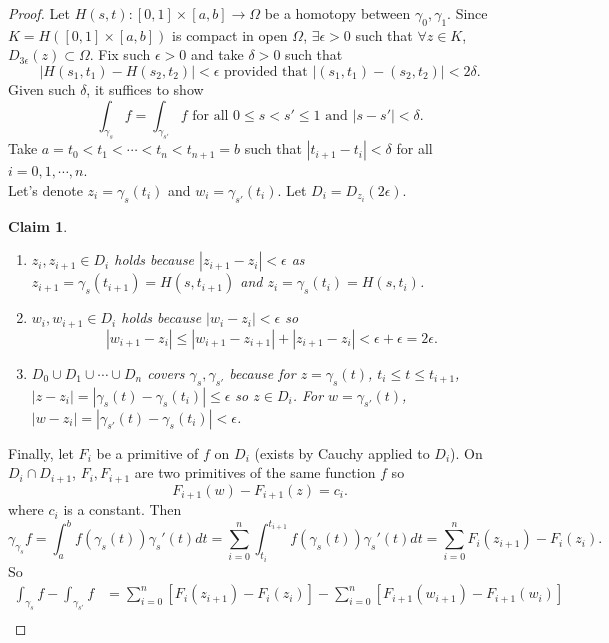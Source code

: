 \documentclass[a4paper]{article}
\newtheorem{claim}[thm]{Claim}
\begin{document}
\begin{proof}
    Let $H(s,t):[0,1]\times [a,b]\to \Omega$ be a homotopy between $\gamma_0,\gamma_1$. Since $K=H([0,1]\times [a,b])$ is compact in open $\Omega$, $\exists \epsilon>0$ such that $\forall z\in K$, $D_{3\epsilon}(z)\subset \Omega$. Fix such $\epsilon>0$ and take $\delta>0$ such that \[
    |H(s_1,t_1)-H(s_2,t_2)|<\epsilon \text{ provided that } |(s_1,t_1)-(s_2,t_2)|<2\delta \tag{unif cont of $H$}
    .\] 
    Given such $\delta$, it suffices to show \[
    \int_{\gamma_s}f=\int_{\gamma_{s'}}f \text{ for all } 0\leq s<s'\leq 1 \text{ and } |s-s'|<\delta
    .\] 
    Take $a=t_0<t_1<\cdots<t_n<t_{n+1}=b$ such that $|t_{i+1}-t_{i}|<\delta$ for all $i=0,1,\cdots,n$. \\
    Let's denote $z_i=\gamma_s(t_i)$ and $w_i=\gamma_{s'}(t_i)$. Let $D_i=D_{z_i}(2\epsilon)$. 
    \begin{claim}
        \begin{enumerate}
            \item $z_i,z_{i+1}\in D_i$ holds because $|z_{i+1}-z_i|<\epsilon$ as $z_{i+1}=\gamma_s(t_{i+1})=H(s,t_{i+1})$ and $z_i=\gamma_s(t_i)=H(s,t_i)$. \\
            \item $w_i,w_{i+1}\in D_i$ holds because $|w_i-z_i|<\epsilon$ so \[
            |w_{i+1}-z_i|\leq |w_{i+1}-z_{i+1}|+|z_{i+1}-z_i|<\epsilon+\epsilon=2\epsilon
            .\] 
            \item $D_0\cup D_1\cup \cdots \cup D_n$ covers $\gamma_s,\gamma_{s'}$ because for $z=\gamma_s(t)$, $t_i\leq t\leq t_{i+1}$, $|z-z_i|=|\gamma_s(t)-\gamma_s(t_i)|\leq \epsilon$ so $z\in D_i$. For $w=\gamma_{s'}(t)$, $|w-z_i|=|\gamma_{s'}(t)-\gamma_s(t_i)|<\epsilon$. 
        \end{enumerate}
    \end{claim}
    \noindent Finally, let $F_i$ be a primitive of $f$ on $D_i$ (exists by Cauchy applied to $D_i$). On $D_i\cap D_{i+1}$, $F_i,F_{i+1}$ are two primitives of the same function $f$ so \[
    F_{i+1}(w)-F_{i+1}(z)=c_i
    .\] 
    where $c_i$ is a constant. 
    Then \[
    \gamma_{\gamma_s}f=\int_{a}^{b}f(\gamma_s(t))\gamma_s'(t)dt=\sum_{i=0}^n \int_{t_i}^{t_{i+1}}f(\gamma_s(t))\gamma_s'(t)dt=\sum_{i=0}^n F_{i}(z_{i+1})-F_{i}(z_i)
    .\] 
    So 
    \begin{align*}
        \int_{\gamma_s}f-\int_{\gamma_{s'}}f&=\sum_{i=0}^n \left [ F_{i}(z_{i+1})-F_{i}(z_i) \right ]-\sum_{i=0}^n \left [ F_{i+1}(w_{i+1})-F_{i+1}(w_i) \right ]\\

\end{align*}
\end{proof}
\end{document}
